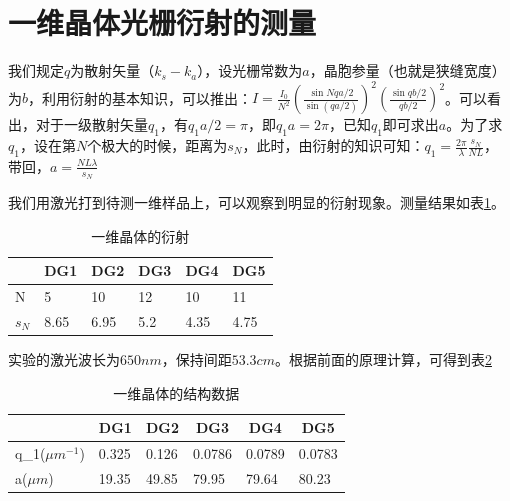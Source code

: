 \documentclass[fleqn,10pt]{SelfArx} %
\affiliation{} %
\begin{document}
\maketitle %

\tableofcontents %

\thispagestyle{empty} %


\section{一维晶体光栅衍射的测量} %

我们规定$q$为散射矢量（$k_s-k_a$），设光栅常数为$a$，晶胞参量（也就是狭缝宽度）为$b$，利用衍射的基本知识，可以推出：$I=\frac{I_0}{N^2}(\frac{\sin{Nqa/2}}{\sin{(qa/2)}})^2(\frac{\sin{qb/2}}{qb/2})^2$。可以看出，对于一级散射矢量$q_1$，有$q_1a/2=\pi$，即$q_1a=2\pi$，已知$q_1$即可求出$a$。为了求$q_1$，设在第$N$个极大的时候，距离为$s_N$，此时，由衍射的知识可知：$q_1=\frac{2\pi}{\lambda}\frac{s_N}{NL}$，带回，$a=\frac{NL\lambda}{s_N}$

我们用激光打到待测一维样品上，可以观察到明显的衍射现象。测量结果如表\ref{tab:1}。
\begin{table}[htbp]
\centering
\begin{tabular}{|l|l|l|l|l|l|}
\hline
      & DG1  & DG2  & DG3 & DG4  & DG5  \\ \hline
N     & 5    & 10   & 12  & 10   & 11   \\ \hline
$s_N$ & 8.65 & 6.95 & 5.2 & 4.35 & 4.75 \\ \hline
\end{tabular}
\caption{一维晶体的衍射}
\label{tab:1}
\end{table}

实验的激光波长为$650nm$，保持间距$53.3cm$。根据前面的原理计算，可得到表\ref{tab:2}
\begin{table}[htbp]
\centering
\begin{tabular}{|l|l|l|l|l|l|}
\hline
\multicolumn{1}{|c|}{\textbf{}} &
  \multicolumn{1}{c|}{\textbf{DG1}} &
  \multicolumn{1}{c|}{\textbf{DG2}} &
  \multicolumn{1}{c|}{\textbf{DG3}} &
  \multicolumn{1}{c|}{\textbf{DG4}} &
  \multicolumn{1}{c|}{\textbf{DG5}} \\ \hline
q\_1($\mu m^{-1}$) &
  0.325 &
  0.126 &
  0.0786 &
  0.0789 &
  0.0783 \\ \hline
a($\mu m$) &
  19.35 &
  49.85 &
  79.95 &
  79.64 &
  80.23 \\ \hline
\end{tabular}
\caption{一维晶体的结构数据}
\label{tab:2}
\end{table}
\end{document}
